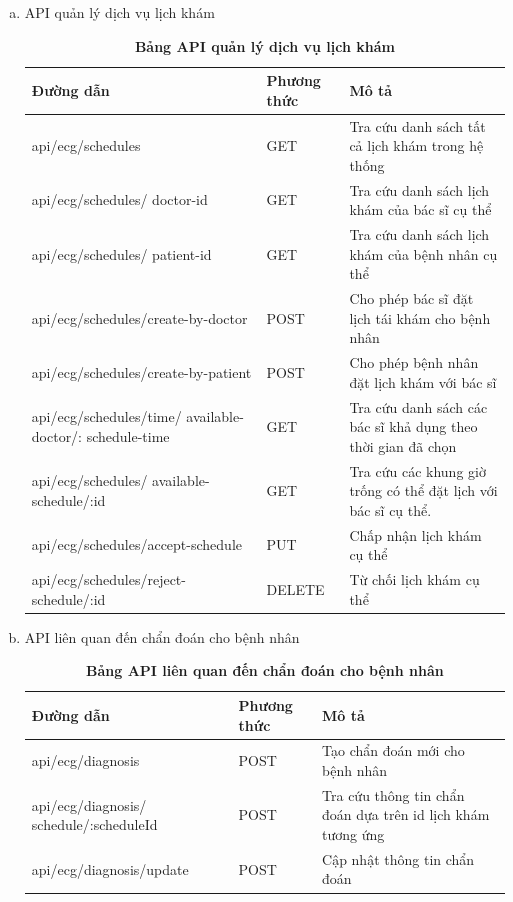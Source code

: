 \begin{enumerate}[a)]
	  
	  \item API quản lý dịch vụ lịch khám
	  \begin{xltabular}{\textwidth}{
		| >{\raggedright\arraybackslash}m{4.5cm}
		| >{\centering\arraybackslash}m{2.8cm}
		| >{\raggedright\arraybackslash}X |
		}
		\caption{\bfseries \fontsize{12pt}{0pt}\selectfont Bảng API quản lý dịch vụ lịch khám}
		\label{table_api_schedule}
		\\
		\hline
		\bfseries Đường dẫn    &\bfseries Phương thức    &\bfseries Mô tả\\ \hline
		api/ecg/schedules   &   GET  & Tra cứu danh sách tất cả lịch khám trong hệ thống \\ \hline
		api/ecg/schedules/ doctor-id  &    GET    & Tra cứu danh sách lịch khám của bác sĩ cụ thể \\ \hline
		api/ecg/schedules/ patient-id  &    GET    & Tra cứu danh sách lịch khám của bệnh nhân cụ thể \\ \hline
		api/ecg/schedules/create-by-doctor  &    POST    & Cho phép bác sĩ đặt lịch tái khám cho bệnh nhân \\ \hline
		api/ecg/schedules/create-by-patient  &    POST    & Cho phép bệnh nhân đặt lịch khám với bác sĩ \\ \hline
		api/ecg/schedules/time/ available-doctor/: schedule-time  &    GET    & Tra cứu danh sách các bác sĩ khả dụng theo thời gian đã chọn \\ \hline
		api/ecg/schedules/ available-schedule/:id  &    GET    & Tra cứu các khung giờ trống có thể đặt lịch với bác sĩ cụ thể. \\ \hline
		api/ecg/schedules/accept-schedule  &    PUT    & Chấp nhận lịch khám cụ thể \\ \hline
		api/ecg/schedules/reject-schedule/:id  &    DELETE    & Từ chối lịch khám cụ thể \\ \hline
		\end{xltabular}
	  
	  \item API liên quan đến chẩn đoán cho bệnh nhân
	  \begin{xltabular}{\textwidth}{
		| >{\raggedright\arraybackslash}m{4.5cm}
		| >{\centering\arraybackslash}m{2.8cm}
		| >{\raggedright\arraybackslash}X |
		}
		\caption{\bfseries \fontsize{12pt}{0pt}\selectfont Bảng API liên quan đến chẩn đoán cho bệnh nhân}
		\label{table_api_diagnosis}
		\\
		\hline
		\bfseries Đường dẫn    &\bfseries Phương thức    &\bfseries Mô tả\\ \hline
		api/ecg/diagnosis   &   POST  & Tạo chẩn đoán mới cho bệnh nhân \\ \hline
		api/ecg/diagnosis/ schedule/:scheduleId   &   POST  & Tra cứu thông tin chẩn đoán dựa trên id lịch khám tương ứng\\ \hline
		api/ecg/diagnosis/update   &   POST  & Cập nhật thông tin chẩn đoán \\ \hline
		\end{xltabular}
	  

\end{enumerate}
